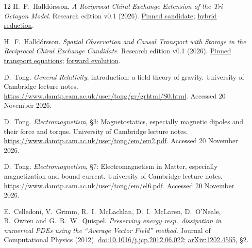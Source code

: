 \begin{thebibliography}{12}
H.~F.~Halldórsson.
\emph{A Reciprocal Chiral Exchange Extension of the Tri-Octagon Model}.
Research edition v0.1 (2026).
\href{https://github.com/pzychozen/trioctagon-physics/blob/ca22652dc000ca2b16419c1af4167918eab1ae94/papers/RECIPROCAL_CHIRAL_EXCHANGE/publication/v0.1/manuscript/candidate.tex}{Pinned candidate};
\href{https://github.com/pzychozen/trioctagon-physics/blob/ca22652dc000ca2b16419c1af4167918eab1ae94/papers/RECIPROCAL_CHIRAL_EXCHANGE/publication/v0.1/manuscript/hybrid.tex}{hybrid reduction}.

H.~F.~Halldórsson.
\emph{Spatial Observation and Causal Transport with Storage in the Reciprocal Chiral Exchange Candidate}.
Research edition v0.1 (2026).
\href{https://github.com/pzychozen/trioctagon-physics/blob/ca22652dc000ca2b16419c1af4167918eab1ae94/papers/SPATIAL_WORK_CAUSAL_TRANSPORT/publication/v0.1/sections/05_transport.tex}{Pinned transport equations};
\href{https://github.com/pzychozen/trioctagon-physics/blob/ca22652dc000ca2b16419c1af4167918eab1ae94/papers/SPATIAL_WORK_CAUSAL_TRANSPORT/publication/v0.1/sections/06_evolution.tex}{forward evolution}.

D.~Tong.
\emph{General Relativity}, introduction: a field theory of gravity.
University of Cambridge lecture notes.
\url{https://www.damtp.cam.ac.uk/user/tong/gr/grhtml/S0.html}.
Accessed 20 November 2026.

D.~Tong.
\emph{Electromagnetism}, §3: Magnetostatics, especially magnetic dipoles and their force and torque.
University of Cambridge lecture notes.
\url{https://www.damtp.cam.ac.uk/user/tong/em/em2.pdf}.
Accessed 20 November 2026.

D.~Tong.
\emph{Electromagnetism}, §7: Electromagnetism in Matter, especially magnetization and bound current.
University of Cambridge lecture notes.
\url{https://www.damtp.cam.ac.uk/user/tong/em/el6.pdf}.
Accessed 20 November 2026.

E.~Celledoni, V.~Grimm, R.~I.~McLachlan, D.~I.~McLaren, D.~O'Neale,
B.~Owren and G.~R.~W.~Quispel.
\emph{Preserving energy resp.\ dissipation in numerical PDEs using the “Average Vector Field” method}.
Journal of Computational Physics (2012).
\href{https://doi.org/10.1016/j.jcp.2012.06.022}{doi:10.1016/j.jcp.2012.06.022};
\href{https://arxiv.org/abs/1202.4555}{arXiv:1202.4555}, §2.
\end{thebibliography}
